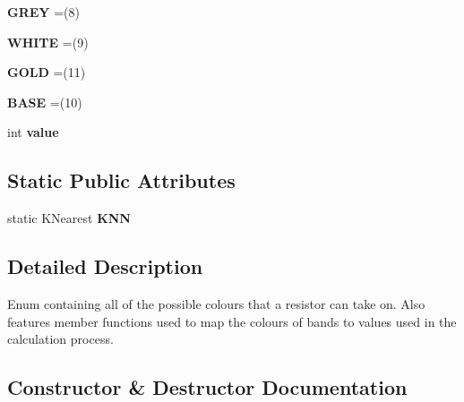 \begin{DoxyCompactItemize}
{\bfseries G\+R\+EY} =(8)
\item 
\hypertarget{enumohm_1_1valueidentification_1_1_resistor_colour_a0f173e15f1e62f7f1c4e80ba5991dd87}{}\label{enumohm_1_1valueidentification_1_1_resistor_colour_a0f173e15f1e62f7f1c4e80ba5991dd87} 
{\bfseries W\+H\+I\+TE} =(9)
\item 
\hypertarget{enumohm_1_1valueidentification_1_1_resistor_colour_a0094d82b0ce5aa8e11a1dd86d370ea09}{}\label{enumohm_1_1valueidentification_1_1_resistor_colour_a0094d82b0ce5aa8e11a1dd86d370ea09} 
{\bfseries G\+O\+LD} =(11)
\item 
\hypertarget{enumohm_1_1valueidentification_1_1_resistor_colour_a14ef1a48b49d8038d07d2c067023cb49}{}\label{enumohm_1_1valueidentification_1_1_resistor_colour_a14ef1a48b49d8038d07d2c067023cb49} 
{\bfseries B\+A\+SE} =(10)
\item 
\hypertarget{enumohm_1_1valueidentification_1_1_resistor_colour_a7ce9ef407d138453603a0886d22cbf8d}{}\label{enumohm_1_1valueidentification_1_1_resistor_colour_a7ce9ef407d138453603a0886d22cbf8d} 
int {\bfseries value}
\end{DoxyCompactItemize}
\subsection*{Static Public Attributes}
\begin{DoxyCompactItemize}
\item 
\hypertarget{enumohm_1_1valueidentification_1_1_resistor_colour_a6cbfec1e6406faa4415abb349178fd53}{}\label{enumohm_1_1valueidentification_1_1_resistor_colour_a6cbfec1e6406faa4415abb349178fd53} 
static K\+Nearest {\bfseries K\+NN}
\end{DoxyCompactItemize}


\subsection{Detailed Description}
Enum containing all of the possible colours that a resistor can take on. Also features member functions used to map the colours of bands to values used in the calculation process. 

\subsection{Constructor \& Destructor Documentation}
\hypertarget{enumohm_1_1valueidentification_1_1_resistor_colour_a5828a5bf9478083a393751137153d659}{}\label{enumohm_1_1valueidentification_1_1_resistor_colour_a5828a5bf9478083a393751137153d659} 
